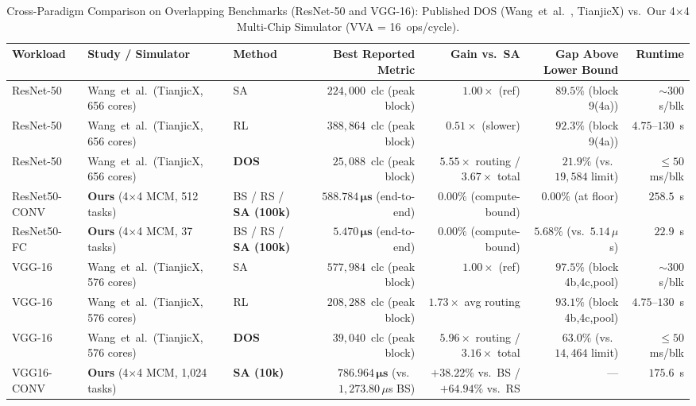 \documentclass[10pt,conference]{IEEEtran}
\begin{document}
\begin{table}[t]
  \caption{Cross-Paradigm Comparison on Overlapping Benchmarks (ResNet-50 and VGG-16): Published DOS (Wang~et~al.~\cite{wang2025dos}, TianjicX) vs.\ Our 4$\times$4 Multi-Chip Simulator (VVA = 16~ops/cycle).}
  \label{tab:dos-comparison}
  \centering
  \footnotesize
  \setlength{\tabcolsep}{4pt}
  \begin{tabular}{lllrrrr}
    \toprule
    Workload & Study / Simulator & Method & Best Reported Metric & Gain vs.\ SA & Gap Above Lower Bound & Runtime \\
    \midrule
    ResNet-50 & Wang~et~al.\ (TianjicX, 656 cores) & SA & $224,000$~clc (peak block) & $1.00{\times}$ (ref) & $89.5\%$ (block 9(4a)) & $\sim 300$~s/blk \\
    ResNet-50 & Wang~et~al.\ (TianjicX, 656 cores) & RL & $388,864$~clc (peak block) & $0.51{\times}$ (slower) & $92.3\%$ (block 9(4a)) & $4.75\text{--}130$~s \\
    ResNet-50 & Wang~et~al.\ (TianjicX, 656 cores) & \textbf{DOS} & $25,088$~clc (peak block) & $\mathbf{5.55{\times}}$ routing / $\mathbf{3.67{\times}}$ total & $21.9\%$ (vs.\ $19,584$ limit) & $\le 50$~ms/blk \\
    ResNet50-CONV & \textbf{Ours} (4$\times$4 MCM, 512 tasks) & BS / RS / \textbf{SA (100k)} & $\mathbf{588.784\,\mu\text{s}}$ (end-to-end) & $0.00\%$ (compute-bound) & $0.00\%$ (at floor) & $258.5$~s \\
    ResNet50-FC & \textbf{Ours} (4$\times$4 MCM, 37 tasks) & BS / RS / \textbf{SA (100k)} & $\mathbf{5.470\,\mu\text{s}}$ (end-to-end) & $0.00\%$ (compute-bound) & $5.68\%$ (vs.\ $5.14\,\mu$s) & $22.9$~s \\
    \midrule
    VGG-16 & Wang~et~al.\ (TianjicX, 576 cores) & SA & $577,984$~clc (peak block) & $1.00{\times}$ (ref) & $97.5\%$ (block 4b,4c,pool) & $\sim 300$~s/blk \\
    VGG-16 & Wang~et~al.\ (TianjicX, 576 cores) & RL & $208,288$~clc (peak block) & $1.73{\times}$ avg routing & $93.1\%$ (block 4b,4c,pool) & $4.75\text{--}130$~s \\
    VGG-16 & Wang~et~al.\ (TianjicX, 576 cores) & \textbf{DOS} & $39,040$~clc (peak block) & $\mathbf{5.96{\times}}$ routing / $\mathbf{3.16{\times}}$ total & $63.0\%$ (vs.\ $14,464$ limit) & $\le 50$~ms/blk \\
    VGG16-CONV & \textbf{Ours} (4$\times$4 MCM, 1,024 tasks) & \textbf{SA (10k)} & $\mathbf{786.964\,\mu\text{s}}$ (vs.\ $1,273.80\,\mu$s BS) & $+38.22\%$ vs.\ BS / $+64.94\%$ vs.\ RS & --- & $175.6$~s \\

\end{tabular}
\end{table}
\end{document}
